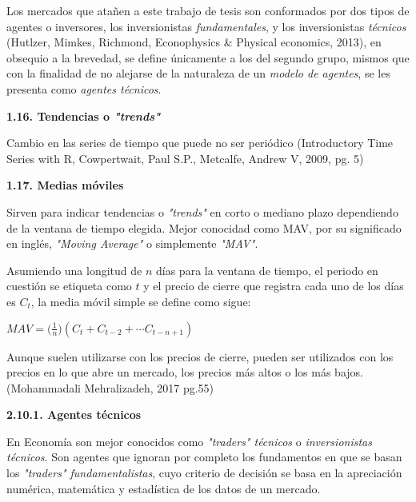 Los mercados que atañen a este trabajo de tesis son conformados por dos tipos de agentes o inversores, los inversionistas \textit{fundamentales}, y los inversionistas \textit{técnicos} (Hutlzer, Mimkes, Richmond, Econophysics \& Physical economics, 2013), en obsequio a la brevedad, se define únicamente a los del segundo grupo, mismos que con la finalidad de no alejarse de la naturaleza de un \textit{modelo de agentes}, se les presenta como \textit{agentes técnicos}.

\newpage
\vspace{0.5cm}
{
\noindent
\Large  \textbf{1.16. Tendencias o \textit{"trends"}} 
}
\newline

Cambio en las series de tiempo que puede no ser periódico (Introductory Time Series with R, Cowpertwait, Paul S.P., Metcalfe, Andrew V, 2009, pg. 5)

{
\noindent
\Large  \textbf{1.17. Medias móviles} 
}
\newline

Sirven para indicar tendencias o \textit{"trends"} en corto o mediano plazo dependiendo de la ventana de tiempo elegida. Mejor conocidad como MAV, por su significado en inglés, \textit{"Moving Average"} o simplemente \textit{"MAV"}.

Asumiendo una longitud de $n$ días para la ventana de tiempo, el periodo en cuestión se etiqueta como $t$ y el precio de cierre que registra cada uno de los días es $C_t$, la media móvil simple se define como sigue: 

\begin{center}
$MAV = \biggl( \frac{1}{n} \biggr)(C_{t} + C_{t-2} + \cdots C_{t-n+1})$
\end{center}

Aunque suelen utilizarse con los precios de cierre, pueden ser utilizados con los precios en lo que abre un mercado, los precios más altos o los más bajos. (Mohammadali Mehralizadeh, 2017 pg.55)

{
\noindent
\Large  \textbf{2.10.1. Agentes técnicos} 
}
\newline

En Economía son mejor conocidos como \textit{"traders" técnicos} o \textit{inversionistas técnicos}. Son agentes que ignoran por completo los fundamentos en que se basan los \textit{"traders" fundamentalistas}, cuyo criterio de decisión se basa en la apreciación numérica, matemática y estadística de los datos de un mercado. \vspace{0.5cm}

